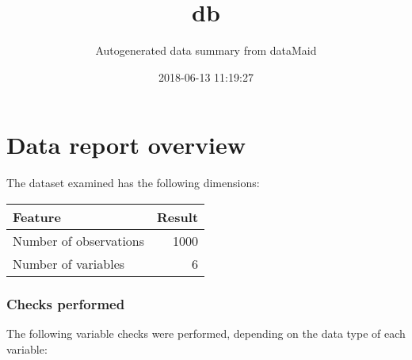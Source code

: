 \documentclass[]{article}
\title{db}
\subtitle{Autogenerated data summary from dataMaid}
\author{}
\date{2018-06-13 11:19:27}
\begin{document}
\maketitle

\section{Data report overview}\label{data-report-overview}

The dataset examined has the following dimensions:

\begin{longtable}[]{@{}lr@{}}
\toprule
\begin{minipage}[b]{0.33\columnwidth}\raggedright\strut
Feature\strut
\end{minipage} & \begin{minipage}[b]{0.10\columnwidth}\raggedleft\strut
Result\strut
\end{minipage}\tabularnewline
\midrule
\endhead
\begin{minipage}[t]{0.33\columnwidth}\raggedright\strut
Number of observations\strut
\end{minipage} & \begin{minipage}[t]{0.10\columnwidth}\raggedleft\strut
1000\strut
\end{minipage}\tabularnewline
\begin{minipage}[t]{0.33\columnwidth}\raggedright\strut
Number of variables\strut
\end{minipage} & \begin{minipage}[t]{0.10\columnwidth}\raggedleft\strut
6\strut
\end{minipage}\tabularnewline
\bottomrule
\end{longtable}

\subsubsection{Checks performed}\label{checks-performed}

The following variable checks were performed, depending on the data type
of each variable:
\end{document}
